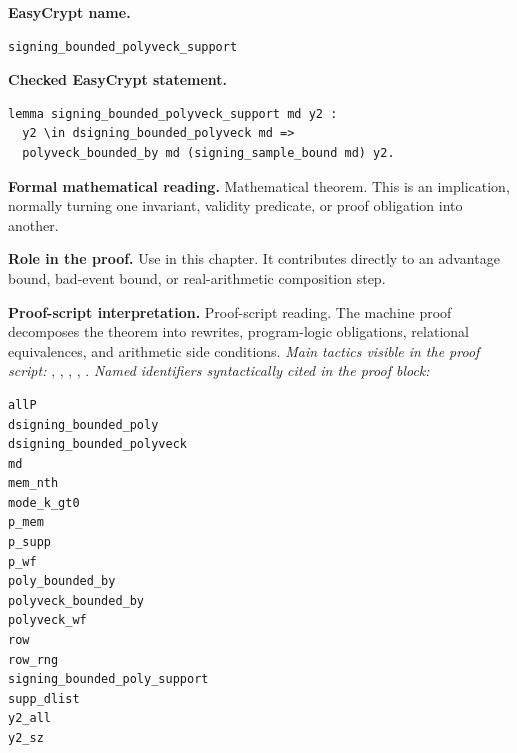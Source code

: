 \begin{formaltheorem}
\noindent\textbf{EasyCrypt name.}
\begin{lstlisting}[language=EasyCrypt,basicstyle=\ttfamily\scriptsize]
signing_bounded_polyveck_support
\end{lstlisting}
\noindent\textbf{Checked EasyCrypt statement.}
\begin{lstlisting}[language=EasyCrypt,basicstyle=\ttfamily\scriptsize]
lemma signing_bounded_polyveck_support md y2 :
  y2 \in dsigning_bounded_polyveck md =>
  polyveck_bounded_by md (signing_sample_bound md) y2.
\end{lstlisting}
\noindent\textbf{Formal mathematical reading.}
Mathematical theorem. This is an implication, normally turning one invariant, validity predicate, or proof obligation into another.

\noindent\textbf{Role in the proof.}
Use in this chapter. It contributes directly to an advantage bound, bad-event bound, or real-arithmetic composition step.

\noindent\textbf{Proof-script interpretation.}
Proof-script reading. The machine proof decomposes the theorem into rewrites, program-logic obligations, relational equivalences, and arithmetic side conditions.
\emph{Main tactics visible in the proof script:} , , , , .
\emph{Named identifiers syntactically cited in the proof block:}
\begin{lstlisting}[language=EasyCrypt,basicstyle=\ttfamily\scriptsize]
allP
dsigning_bounded_poly
dsigning_bounded_polyveck
md
mem_nth
mode_k_gt0
p_mem
p_supp
p_wf
poly_bounded_by
polyveck_bounded_by
polyveck_wf
row
row_rng
signing_bounded_poly_support
supp_dlist
y2_all
y2_sz
\end{lstlisting}

\end{formaltheorem}


